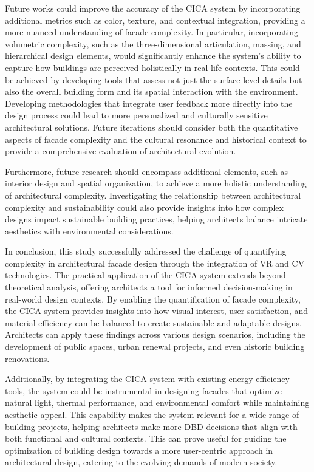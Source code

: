 Future works could improve the accuracy of the CICA system by incorporating additional metrics such as color, texture, and contextual integration, providing a more nuanced understanding of facade complexity.
In particular, incorporating volumetric complexity, such as the three-dimensional articulation, massing, and hierarchical design elements, would significantly enhance the system’s ability to capture how buildings are perceived holistically in real-life contexts.
This could be achieved by developing tools that assess not just the surface-level details but also the overall building form and its spatial interaction with the environment.
Developing methodologies that integrate user feedback more directly into the design process could lead to more personalized and culturally sensitive architectural solutions.
Future iterations should consider both the quantitative aspects of facade complexity and the cultural resonance and historical context to provide a comprehensive evaluation of architectural evolution.

Furthermore, future research should encompass additional elements, such as interior design and spatial organization, to achieve a more holistic understanding of architectural complexity.
Investigating the relationship between architectural complexity and sustainability could also provide insights into how complex designs impact sustainable building practices, helping architects balance intricate aesthetics with environmental considerations.

In conclusion, this study successfully addressed the challenge of quantifying complexity in architectural facade design through the integration of VR and CV technologies.
The practical application of the CICA system extends beyond theoretical analysis, offering architects a tool for informed decision-making in real-world design contexts.
By enabling the quantification of facade complexity, the CICA system provides insights into how visual interest, user satisfaction, and material efficiency can be balanced to create sustainable and adaptable designs.
Architects can apply these findings across various design scenarios, including the development of public spaces, urban renewal projects, and even historic building renovations.

Additionally, by integrating the CICA system with existing energy efficiency tools, the system could be instrumental in designing facades that optimize natural light, thermal performance, and environmental comfort while maintaining aesthetic appeal.
This capability makes the system relevant for a wide range of building projects, helping architects make more DBD decisions that align with both functional and cultural contexts.
This can prove useful for guiding the optimization of building design towards a more user-centric approach in architectural design, catering to the evolving demands of modern society.

